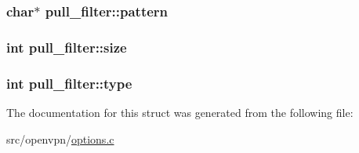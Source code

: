 \subsubsection[{pattern}]{\setlength{\rightskip}{0pt plus 5cm}char$\ast$ pull\+\_\+filter\+::pattern}\label{structpull__filter_a57e01ea9f0c86327fac90cb4e5480ba6}
\hypertarget{structpull__filter_a39e34fe456f78a37ed09a438cd92403a}{}
\subsubsection[{size}]{\setlength{\rightskip}{0pt plus 5cm}int pull\+\_\+filter\+::size}\label{structpull__filter_a39e34fe456f78a37ed09a438cd92403a}
\hypertarget{structpull__filter_a147071222d7c866ca63ee39cb4329c85}{}
\subsubsection[{type}]{\setlength{\rightskip}{0pt plus 5cm}int pull\+\_\+filter\+::type}\label{structpull__filter_a147071222d7c866ca63ee39cb4329c85}


The documentation for this struct was generated from the following file\+:\begin{DoxyCompactItemize}
\item 
src/openvpn/\hyperlink{options_8c}{options.\+c}\end{DoxyCompactItemize}
